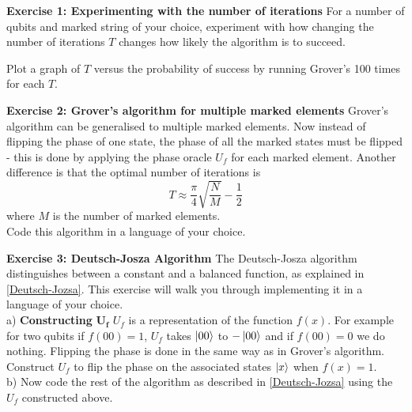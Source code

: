 \begin{tcolorbox}[standard jigsaw,
    opacityback=0, boxrule=0.5pt]
    {\bf Exercise 1: Experimenting with the number of iterations}
    \tcbline
    For a number of qubits and marked string of your choice, experiment with how changing the number of iterations $T$ changes how likely the algorithm is to succeed.
    
    Plot a graph of $T$ versus the probability of success by running Grover's 100 times for each $T$.
\end{tcolorbox}

\begin{tcolorbox}[standard jigsaw,
    opacityback=0, boxrule=0.5pt]
    {\bf Exercise 2: Grover's algorithm for multiple marked elements}
    \tcbline
    Grover's algorithm can be generalised to multiple marked elements. Now instead of flipping the phase of one state, the phase of all the marked states must be flipped - this is done by applying the phase oracle $U_f$ for each marked element. Another difference is that the optimal number of iterations is 
    \begin{equation*}
        T \approx \frac{\pi}{4} \sqrt{\frac{N}{M}} - \frac{1}{2}
    \end{equation*}
    where $M$ is the number of marked elements. \\
    Code this algorithm in a language of your choice.
\end{tcolorbox}

\begin{tcolorbox}[standard jigsaw, opacityback=0, boxrule=0.5pt]
    {\bf Exercise 3: Deutsch-Josza Algorithm}
    \tcbline
    The Deutsch-Josza algorithm distinguishes between a constant and a balanced function, as explained in \autoref{Deutsch-Jozsa}. This exercise will walk you through implementing it in a language of your choice. \\
    
    a) \textbf{Constructing }$\bm{U_f}$ $U_f$ is a representation of the function $f(x)$. For example for two qubits if $f(00) = 1$, $U_f$ takes $\left\vert{00}\right\rangle$ to $-\left\vert{00}\right\rangle$ and if $f(00) = 0$ we do nothing. Flipping the phase is done in the same way as in Grover's algorithm. \\
    Construct $U_f$ to flip the phase on the associated states $\left\vert{x}\right\rangle$ when $f(x) = 1$. \\
    
    b) Now code the rest of the algorithm as described in \autoref{Deutsch-Jozsa} using the $U_f$ constructed above.
\end{tcolorbox}

